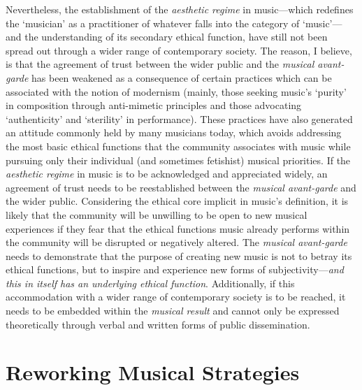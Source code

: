 Nevertheless, the establishment of the \emph{aesthetic regime} in music---which redefines the `musician' as a practitioner of whatever falls into the category of `music'---and the understanding of its secondary ethical function, have still not been spread out through a wider range of contemporary society. The reason, I believe, is that the agreement of trust between the wider public and the \emph{musical avant-garde} has been weakened as a consequence of certain practices which can be associated with the notion of modernism (mainly, those seeking music's `purity'  in composition through anti-mimetic principles and those advocating `authenticity' and `sterility' in performance). These practices have also generated an attitude commonly held by many musicians today, which avoids addressing the most basic ethical functions that the community associates with music while pursuing only their individual (and sometimes fetishist) musical priorities. If the \emph{aesthetic regime} in music is to be acknowledged and appreciated widely, an agreement of trust needs to be reestablished between the \emph{musical avant-garde} and the wider public. Considering the ethical core implicit in music's definition, it is likely that the community will be unwilling to be open to new musical experiences if they fear that the ethical functions music already performs within the community will be disrupted or negatively altered. The \emph{musical avant-garde} needs to demonstrate that the purpose of creating new music is not to betray its ethical functions, but to inspire and experience new forms of subjectivity---\emph{and this in itself has an underlying ethical function}. Additionally, if this accommodation with a wider range of contemporary society is to be reached, it needs to be embedded within the \emph{musical result} and cannot only be expressed theoretically through verbal and written forms of public dissemination.

\section{Reworking Musical Strategies}

